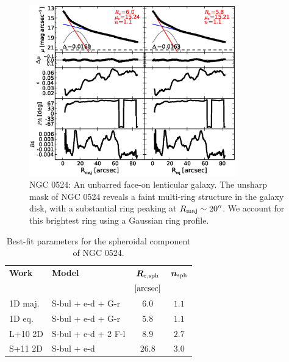 \documentclass[preprint2]{emulateapj}
\newcommand{\fitfigurewidth}{0.8\textwidth}
\begin{document}
  \begin{figure}[h]
  \begin{center}
  \includegraphics[width=\fitfigurewidth]{n0524_1Dfit.eps}
  \caption{NGC 0524: 
  An unbarred face-on lenticular galaxy. 
  The unsharp mask of NGC 0524 reveals a faint multi-ring structure in the galaxy disk,
  with a substantial ring peaking at $R_{\rm maj} \sim 20''$.
  We account for this brightest ring using a Gaussian ring profile.
  }
  \end{center}
  \end{figure}

  \begin{table}[h]
  \small
  \caption{Best-fit parameters for the spheroidal component of NGC 0524.}
  \begin{center}
  \begin{tabular}{llcc}
  \hline
  {\bf Work} & {\bf Model}   & $\bm R_{\rm e,sph}$    & $\bm n_{\rm sph}$ \\
    &  &  $[\rm arcsec]$ & \\
  \hline
  1D maj. & S-bul + e-d + G-r & $6.0$  &  $1.1$ \\
  1D eq.  & S-bul + e-d + G-r & $5.8$  &  $1.1$ \\
  \hline
  L+10 2D      & S-bul + e-d + 2 F-l & $8.9$   &  $2.7$ \\
  S+11 2D      & S-bul + e-d	  & $26.8$  &  $3.0$ \\
  \hline
  \end{tabular}
  \end{center}
  \label{tab:n0524}
  \end{table}
\end{document}
